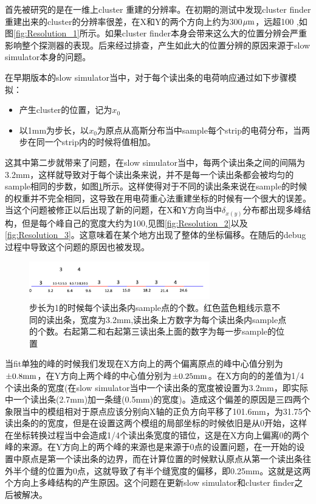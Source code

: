 首先被研究的是在一维上cluster 重建的分辨率。在初期的测试中发现cluster finder重建出来的cluster的分辨率很差，在X和Y的两个方向上约为300${\rm \mu m}$，远超100 \mum ,如图\ref{fig:Resolution_1}所示。如果cluster finder本身会带来这么大的位置分辨会严重影响整个探测器的表现。后来经过排查，产生如此大的位置分辨的原因来源于slow simulator本身的问题。

在早期版本的slow simulator当中，对于每个读出条的电荷响应通过如下步骤模拟：
\begin{itemize}
    \item[1.] 产生cluster的位置，记为$x_0$
    \item[2.] 以1mm为步长，以$x_0$为原点从高斯分布当中sample每个strip的电荷分布，当两步在同一个strip内的时候将值相加。
\end{itemize}
这其中第二步就带来了问题，在slow simulator当中，每两个读出条之间的间隔为3.2mm，这样就导致对于每个读出条来说，并不是每一个读出条都会被均匀的sample相同的步数，如图\ref{fig:Sample_step}所示。这样使得对于不同的读出条来说在sample的时候的权重并不完全相同，这导致在用电荷重心法重建坐标的时候有一个很大的误差。当这个问题被修正以后出现了新的问题，在X和Y方向当中$\delta_{x(y)}$分布都出现多峰结构，但是每个峰自己的宽度大约为100\mum ,见图\ref{fig:Resolution_2}以及\ref{fig:Resolution_3}。这意味着在某个地方出现了整体的坐标偏移。在随后的debug过程中导致这个问题的原因也被发现。
\begin{figure}[htb]
    \begin{center}
    \includegraphics[width=0.7\textwidth,clip]{figures/Chapter3/Sample_step.png}
    \end{center}
    \caption[步长为1mm的时候每个读出条内sample点的个数]{步长为1的时候每个读出条内sample点的个数。红色蓝色粗线示意不同的读出条，宽度为3.2mm,读出条上方数字为每个读出条内sample点的个数。右起第二和右起第三读出条上面的数字为每一步sample的位置}
    \label{fig:Sample_step}
\end{figure}

当fit单独的峰的时候我们发现在X方向上的两个偏离原点的峰中心值分别为${\rm \pm 0.8 mm}$，在Y方向上两个峰的中心值分别为${\rm \pm 0.25 mm}$。在X方向的的差值为1/4个读出条的宽度(在slow simulator当中一个读出条的宽度被设置为3.2mm，即实际中一个读出条(2.7mm)加一条缝(0.5mm)的宽度)。造成这个偏差的原因是三四两个象限当中的模组相对于原点应该分别向X轴的正负方向平移了101.6mm，为31.75个读出条的的宽度，但是在设置这两个模组的局部坐标的时候依旧是从0开始，这样在坐标转换过程当中会造成1/4个读出条宽度的错位，这是在X方向上偏离0的两个峰的来源。在Y方向上的两个峰的来源也是来源于0点的设置问题，在一开始的设置中原点是第一个读出条的边界，而在计算位置的时候默认原点从第一个读出条往外半个缝的位置为0点，这就导致了有半个缝宽度的偏移，即0.25mm。这就是这两个方向上多峰结构的产生原因。这个问题在更新slow simulator和cluster finder之后被解决。

